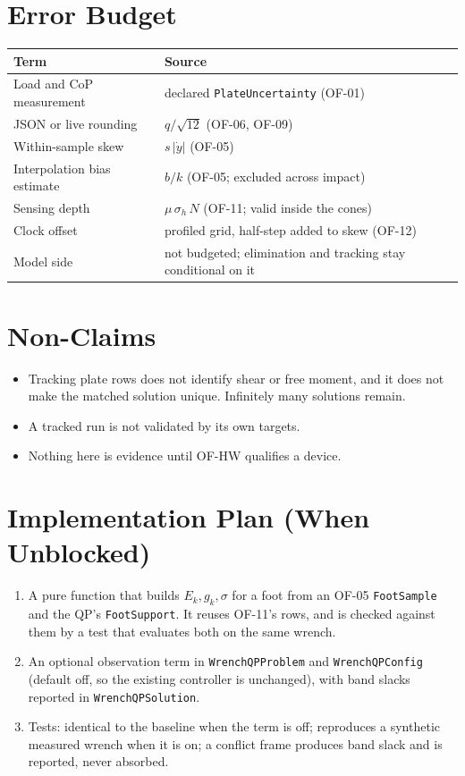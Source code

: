 \documentclass[11pt]{article}
\begin{document}
\section{Error Budget}

\begin{tabular}{@{}ll@{}}
\toprule
Term & Source \\
\midrule
Load and CoP measurement & declared \texttt{PlateUncertainty} (OF-01) \\
JSON or live rounding & $q/\sqrt{12}$ (OF-06, OF-09) \\
Within-sample skew & $s\,|\dot y|$ (OF-05) \\
Interpolation bias estimate & $b/k$ (OF-05; excluded across impact) \\
Sensing depth & $\mu\,\sigma_h\,N$ (OF-11; valid inside the cones) \\
Clock offset & profiled grid, half-step added to skew (OF-12) \\
Model side & not budgeted; elimination and tracking stay conditional on it \\
\bottomrule
\end{tabular}

\section{Non-Claims}

\begin{itemize}
  \item Tracking plate rows does not identify shear or free moment, and it
        does not make the matched solution unique. Infinitely many solutions
        remain.
  \item A tracked run is not validated by its own targets.
  \item Nothing here is evidence until OF-HW qualifies a device.
\end{itemize}

\section{Implementation Plan (When Unblocked)}

\begin{enumerate}
  \item A pure function that builds $E_k, g_k, \sigma$ for a foot from an
        OF-05 \texttt{FootSample} and the QP's \texttt{FootSupport}. It
        reuses OF-11's rows, and is checked against them by a test that
        evaluates both on the same wrench.
  \item An optional observation term in \texttt{WrenchQPProblem} and
        \texttt{WrenchQPConfig} (default off, so the existing controller is
        unchanged), with band slacks reported in \texttt{WrenchQPSolution}.
  \item Tests: identical to the baseline when the term is off; reproduces a
        synthetic measured wrench when it is on; a conflict frame produces
        band slack and is reported, never absorbed.
\end{enumerate}
\end{document}
